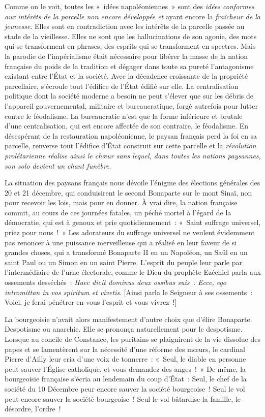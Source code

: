 \documentclass[french,twoside]{book} %
\begin{document}
Comme on le voit, toutes les « idées napoléoniennes » sont des \emph{idées conformes aux intérêts de la parcelle non encore développée et} ayant encore la \emph{fraîcheur de la jeunesse}. Elles sont en contradiction avec les intérêts de la parcelle passée au stade de la vieillesse. Elles ne sont que les hallucinations de son agonie, des mots qui se transforment en phrases, des esprits qui se transforment en spectres. Mais la parodie de l’impérialisme était nécessaire pour libérer la masse de la nation française du poids de la tradition et dégager dans toute sa pureté l’antagonisme existant entre l’État et la société. Avec la décadence croissante de la propriété parcellaire, s’écroule tout l’édifice de l’État édifié sur elle. La centralisation politique dont la société moderne a besoin ne peut s’élever que sur les débris de l’appareil gouvernemental, militaire et bureaucratique, forgé autrefois pour lutter contre le féodalisme. La bureaucratie n’est que la forme inférieure et brutale d’une centralisation, qui est encore affectée de son contraire, le féodalisme. En désespérant de la restauration napoléonienne, le paysan français perd la foi en sa parcelle, renverse tout l’édifice d’État construit sur cette parcelle et la \emph{révolution prolétarienne réalise ainsi le chœur sans lequel, dans toutes les nations paysannes, son solo devient un chant funèbre}.\par
La situation des paysans français nous dévoile l’énigme des élections générales des 20 et 21 décembre, qui conduisirent le second Bonaparte sur le mont Sinaï, non pour recevoir les lois, mais pour en donner. À vrai dire, la nation française commit, au cours de ces journées fatales, un péché mortel à l’égard de la démocratie, qui est à genoux et prie quotidiennement : « Saint suffrage universel, priez pour nous ! » Les adorateurs du suffrage universel ne veulent évidemment pas renoncer à une puissance merveilleuse qui a réalisé en leur faveur de si grandes choses, qui a transformé Bonaparte II en un Napoléon, un Saül en un saint Paul ou un Simon en un saint Pierre. L’esprit du peuple leur parle par l’intermédiaire de l’urne électorale, comme le Dieu du prophète Ezéchiel parla aux ossements desséchés : \emph{Haec dicit dominus deux ossibus suis : Ecce, ego intromittan in vos spiritum et vivetis}. [Ainsi parla le Seigneur à ses ossements : Voici, je ferai pénétrer en vous l’esprit et vous vivrez !]\par
La bourgeoisie n’avait alors manifestement d’autre choix que d’élire Bonaparte. Despotisme ou anarchie. Elle se prononça naturellement pour le despotisme. Lorsque au concile de Constance, les puritains se plaignirent de la vie dissolue des papes et se lamentèrent sur la nécessité d’une réforme des mœurs, le cardinal Pierre d’Ailly leur cria d’une voix de tonnerre : « Seul, le diable en personne peut sauver l’Église catholique, et vous demandez des anges ! » De même, la bourgeoisie française s’écria au lendemain du coup d’État : Seul, le chef de la société du 10 Décembre peur encore sauver la société bourgeoise ! Seul le vol peut encore sauver la société bourgeoise ! Seul le vol bâtardise la famille, le désordre, l’ordre !\par
\end{document}
